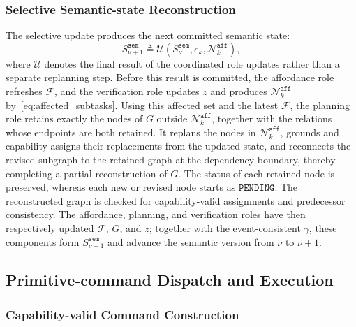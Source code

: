 \subsubsection{Selective Semantic-state Reconstruction}
\label{sec:update_affected_state}

The selective update produces the next committed semantic state:
\begin{equation}
 S_{\nu+1}^{\texttt{sem}}\triangleq
 \mathcal{U}\!\left(
 S_\nu^{\texttt{sem}},e_k,\mathcal{N}_k^{\texttt{aff}}\right),
 \label{eq:semantic_state_update}
\end{equation}
where $\mathcal{U}$ denotes the final result of the coordinated role updates
rather than a separate replanning step. Before this result is committed, the
affordance role refreshes $\mathcal{F}$, and the verification role updates $z$
and produces $\mathcal{N}_k^{\texttt{aff}}$ by~\eqref{eq:affected_subtasks}.
Using this affected set and the latest $\mathcal{F}$, the planning role retains
exactly the nodes of $G$ outside $\mathcal{N}_k^{\texttt{aff}}$, together with
the relations whose endpoints are both retained. It replans the nodes in
$\mathcal{N}_k^{\texttt{aff}}$, grounds and capability-assigns their
replacements from the updated state, and reconnects the revised subgraph to the
retained graph at the dependency boundary, thereby completing a partial
reconstruction of $G$. The status of each retained node is preserved, whereas
each new or revised node starts as $\texttt{PENDING}$. The reconstructed graph
is checked for capability-valid assignments and predecessor consistency. The
affordance, planning, and verification roles have then respectively updated
$\mathcal{F}$, $G$, and $z$; together with the event-consistent $\gamma$, these
components form $S_{\nu+1}^{\texttt{sem}}$ and advance the semantic version from
$\nu$ to $\nu+1$.

\subsection{Primitive-command Dispatch and Execution}
\label{sec:dispatch_execute}

\subsubsection{Capability-valid Command Construction}
\label{sec:construct_commands}

